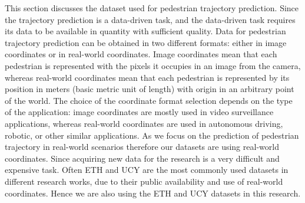 This section discusses the dataset used for pedestrian trajectory prediction. Since the trajectory prediction is a data-driven task, and the data-driven task requires its data to be available in quantity with sufficient quality. Data for pedestrian trajectory prediction can be obtained in two different formats: either in image coordinates or in real-world coordinates. Image coordinates mean that each pedestrian is represented with the pixels it occupies in an image from the camera, whereas real-world coordinates mean that each pedestrian is represented by its position in meters (basic metric unit of length) with origin in an arbitrary point of the world.\newline
The choice of the coordinate format selection depends on the type of the application: image coordinates are mostly used in video surveillance applications, whereas real-world coordinates are used in autonomous driving, robotic, or other similar applications. As we focus on the prediction of pedestrian trajectory in real-world scenarios therefore our datasets are using real-world coordinates.\newline
Since acquiring new data for the research is a very difficult and expensive task. Often ETH and UCY are the most commonly used datasets in different research works, due to their public availability and use of real-world coordinates. Hence we are also using the ETH and UCY datasets in this research.

